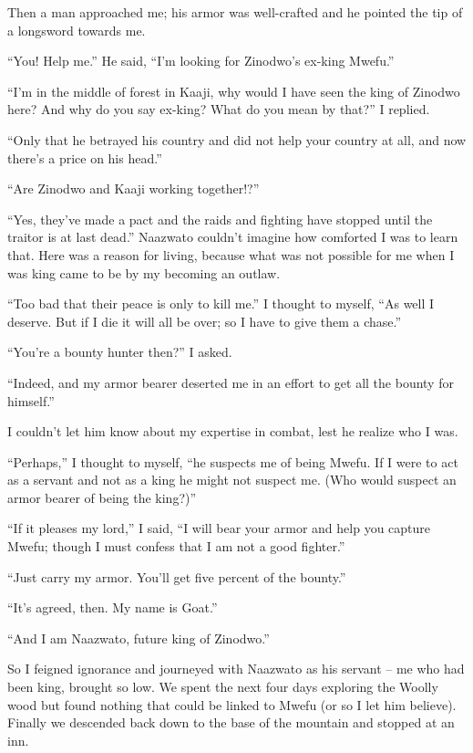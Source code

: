 Then a man approached me; his armor was well-crafted and he pointed the tip of a longsword towards me.

``You! Help me.'' He said, ``I'm looking for Zinodwo's ex-king Mwefu.''

``I'm in the middle of forest in Kaaji, why would I have seen the king of Zinodwo here? And why do you say ex-king? What do you mean by that?'' I replied.

``Only that he betrayed his country and did not help your country at all, and now there's a price on his head.''

``Are Zinodwo and Kaaji working together!?''

``Yes, they've made a pact and the raids and fighting have stopped until the traitor is at last dead.'' Naazwato couldn't imagine how comforted I was to learn that. Here was a reason for living, because what was not possible for me when I was king came to be by my becoming an outlaw. 

``Too bad that their peace is only to kill me.'' I thought to myself, ``As well I deserve. But if I die it will all be over; so I have to give them a chase.''

``You're a bounty hunter then?'' I asked.

``Indeed, and my armor bearer deserted me in an effort to get all the bounty for himself.'' 

I couldn't let him know about my expertise in combat, lest he realize who I was.

``Perhaps,'' I thought to myself, ``he suspects me of being Mwefu. If I were to act as a servant and not as a king he might not suspect me. (Who would suspect an armor bearer of being the king?)''

``If it pleases my lord,'' I said, ``I will bear your armor and help you capture Mwefu; though I must confess that I am not a good fighter.''

``Just carry my armor. You'll get five percent of the bounty.''

``It's agreed, then. My name is Goat.''

``And I am Naazwato, future king of Zinodwo.''

So I feigned ignorance and journeyed with Naazwato as his servant -- me who had been king, brought so low. We spent the next four days exploring the Woolly wood but found nothing that could be linked to Mwefu (or so I let him believe). Finally we descended back down to the base of the mountain and stopped at an inn.

